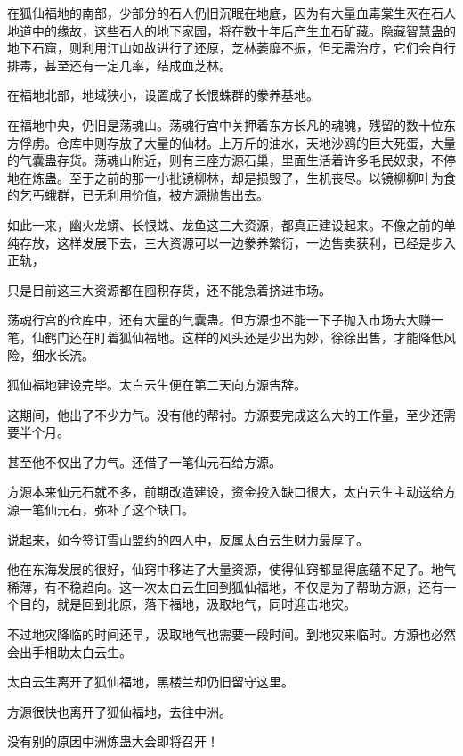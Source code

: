 
\begin{this_body}

在狐仙福地的南部，少部分的石人仍旧沉眠在地底，因为有大量血毒棠生灭在石人地道中的缘故，这些石人的地下家园，将在数十年后产生血石矿藏。隐藏智慧蛊的地下石窟，则利用江山如故进行了还原，芝林萎靡不振，但无需治疗，它们会自行排毒，甚至还有一定几率，结成血芝林。

在福地北部，地域狭小，设置成了长恨蛛群的豢养基地。

在福地中央，仍旧是荡魂山。荡魂行宫中关押着东方长凡的魂魄，残留的数十位东方俘虏。仓库中则存放了大量的仙材。上万斤的油水，天地沙鸥的巨大死蛋，大量的气囊蛊存货。荡魂山附近，则有三座方源石巢，里面生活着许多毛民奴隶，不停地在炼蛊。至于之前的那一小批镜柳林，却是损毁了，生机丧尽。以镜柳柳叶为食的乞丐蛾群，已无利用价值，被方源抛售出去。

如此一来，幽火龙蟒、长恨蛛、龙鱼这三大资源，都真正建设起来。不像之前的单纯存放，这样发展下去，三大资源可以一边豢养繁衍，一边售卖获利，已经是步入正轨，

只是目前这三大资源都在囤积存货，还不能急着挤进市场。

荡魂行宫的仓库中，还有大量的气囊蛊。但方源也不能一下子抛入市场去大赚一笔，仙鹤门还在盯着狐仙福地。这样的风头还是少出为妙，徐徐出售，才能降低风险，细水长流。

狐仙福地建设完毕。太白云生便在第二天向方源告辞。

这期间，他出了不少力气。没有他的帮衬。方源要完成这么大的工作量，至少还需要半个月。

甚至他不仅出了力气。还借了一笔仙元石给方源。

方源本来仙元石就不多，前期改造建设，资金投入缺口很大，太白云生主动送给方源一笔仙元石，弥补了这个缺口。

说起来，如今签订雪山盟约的四人中，反属太白云生财力最厚了。

他在东海发展的很好，仙窍中移进了大量资源，使得仙窍都显得底蕴不足了。地气稀薄，有不稳趋向。这一次太白云生回到狐仙福地，不仅是为了帮助方源，还有一个目的，就是回到北原，落下福地，汲取地气，同时迎击地灾。

不过地灾降临的时间还早，汲取地气也需要一段时间。到地灾来临时。方源也必然会出手相助太白云生。

太白云生离开了狐仙福地，黑楼兰却仍旧留守这里。

方源很快也离开了狐仙福地，去往中洲。

没有别的原因中洲炼蛊大会即将召开！


\end{this_body}
